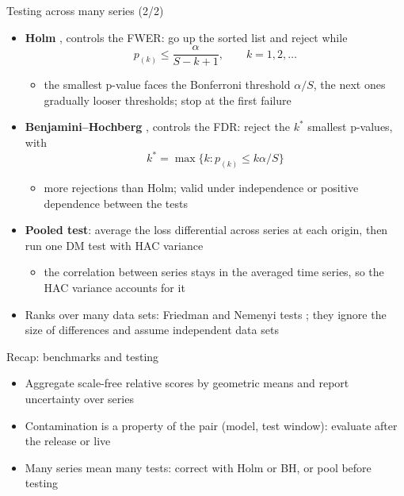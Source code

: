 \begin{frame}{Testing across many series (2/2)}
\itemsize{\small}
\begin{itemize}
    \item \textbf{Holm} , controls the FWER: go up the sorted list and reject while \[ p_{(k)} \le \frac{\alpha}{S - k + 1}, \qquad k = 1, 2, \dots \]
    \begin{itemize}
        \item the smallest p-value faces the Bonferroni threshold $\alpha/S$, the next ones gradually looser thresholds; stop at the first failure
    \end{itemize}
    \item \textbf{Benjamini--Hochberg} , controls the FDR: reject the $k^*$ smallest p-values, with \[ k^* = \max\{k: p_{(k)} \le k\alpha/S\} \]
    \begin{itemize}
        \item more rejections than Holm; valid under independence or positive dependence between the tests
    \end{itemize}
    \item \textbf{Pooled test}: average the loss differential across series at each origin, then run one DM test with HAC variance
    \begin{itemize}
        \item the correlation between series stays in the averaged time series, so the HAC variance accounts for it
    \end{itemize}
    \item Ranks over many data sets: Friedman and Nemenyi tests ; they ignore the size of differences and assume independent data sets
\end{itemize}
\end{frame}

\begin{frame}{Recap: benchmarks and testing}
\itemsize{\small}
\begin{itemize}
    \item Aggregate scale-free relative scores by geometric means and report uncertainty over series
    \item Contamination is a property of the pair (model, test window): evaluate after the release or live
    \item Many series mean many tests: correct with Holm or BH, or pool before testing
\end{itemize}
\end{frame}


